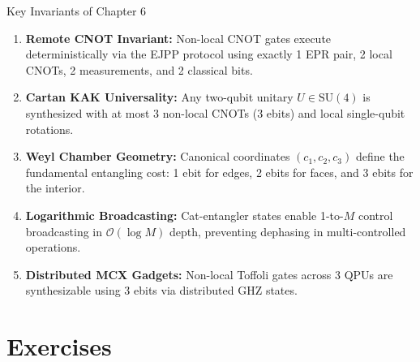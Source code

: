 
\begin{summarybox}{Key Invariants of Chapter 6}
\begin{enumerate}
    \item \textbf{Remote CNOT Invariant:} Non-local CNOT gates execute deterministically via the EJPP protocol using exactly 1 EPR pair, 2 local CNOTs, 2 measurements, and 2 classical bits.
    \item \textbf{Cartan KAK Universality:} Any two-qubit unitary $U \in \text{SU}(4)$ is synthesized with at most 3 non-local CNOTs (3 ebits) and local single-qubit rotations.
    \item \textbf{Weyl Chamber Geometry:} Canonical coordinates $(c_1, c_2, c_3)$ define the fundamental entangling cost: 1 ebit for edges, 2 ebits for faces, and 3 ebits for the interior.
    \item \textbf{Logarithmic Broadcasting:} Cat-entangler states enable 1-to-$M$ control broadcasting in $\mathcal{O}(\log M)$ depth, preventing dephasing in multi-controlled operations.
    \item \textbf{Distributed MCX Gadgets:} Non-local Toffoli gates across 3 QPUs are synthesizable using 3 ebits via distributed GHZ states.
\end{enumerate}
\end{summarybox}


\section*{Exercises}

